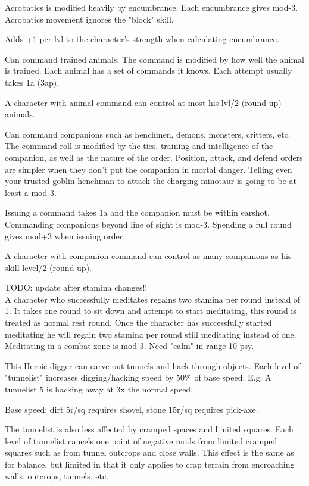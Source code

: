 Acrobatics is modified heavily by encumbrance. Each encumbrance gives mod-3.
Acrobatics movement ignores the "block" skill.


 Adds +1 per lvl to the character's strength when calculating encumbrance.


 Can command trained animals. The command is modified by how well the animal is trained. Each animal has a set of commands it knows. Each attempt usually takes 1a (3ap).

A character with animal command can control at most his lvl/2 (round up) animals.


 Can command companions such as henchmen, demons, monsters, critters, etc. The command roll is modified by the ties, training and intelligence of the companion, as well as the nature of the order. Position, attack, and defend orders are simpler when they don't put the companion in mortal danger. Telling even your trusted goblin henchman to attack the charging minotaur is going to be at least a mod-3.

Issuing a command takes 1a and the companion must be within earshot. Commanding companions beyond line of sight is mod-3. Spending a full round gives mod+3 when issuing order.

A character with companion command can control as many companions as his skill level/2 (round up).


 TODO: update after stamina changes!!\\
A character who successfully meditates regains two stamina per round instead of 1. It takes one round to sit down and attempt to start meditating, this round is treated as normal rest round. Once the character has successfully started meditating he will regain two stamina per round still meditating instead of one.
Meditating in a combat zone is mod-3. Need "calm" in range 10-psy.


 This Heroic digger can carve out tunnels and hack through objects. Each level of "tunnelist" increases digging/hacking speed by 50\% of base speed. E.g: A tunnelist 5 is hacking away at 3x the normal speed.

Base speed: dirt 5r/sq requires shovel, stone 15r/sq requires pick-axe.

The tunnelist is also less affected by cramped spaces and limited squares. Each level of tunnelist cancels one point of negative mods from limited cramped squares such as from tunnel outcrops and close walls. This effect is the same as for balance, but limited in that it only applies to crap terrain from encroaching walls, outcrops, tunnels, etc.



